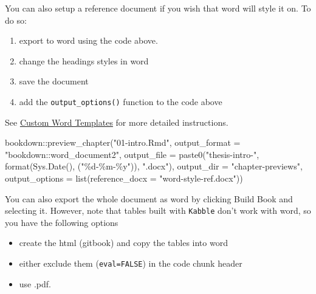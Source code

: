 \documentclass[
  12pt,
  oneside]{book}
\newenvironment{Shaded}{\begin{snugshade}}{\end{snugshade}}
\newcommand{\AttributeTok}[1]{\textcolor[rgb]{0.77,0.63,0.00}{#1}}
\newcommand{\FunctionTok}[1]{\textcolor[rgb]{0.00,0.00,0.00}{#1}}
\newcommand{\NormalTok}[1]{#1}
\newcommand{\SpecialCharTok}[1]{\textcolor[rgb]{0.00,0.00,0.00}{#1}}
\newcommand{\StringTok}[1]{\textcolor[rgb]{0.31,0.60,0.02}{#1}}
\providecommand{\tightlist}{%
  \setlength{\itemsep}{0pt}\setlength{\parskip}{0pt}}
\begin{document}
You can also setup a reference document if you wish that word will style it on. To do so:

\begin{enumerate}
\def\labelenumi{\arabic{enumi}.}
\tightlist
\item
  export to word using the code above.
\item
  change the headings styles in word
\item
  save the document
\item
  add the \texttt{output\_options()} function to the code above
\end{enumerate}

See \href{https://bookdown.org/yihui/rmarkdown-cookbook/word-template.html}{Custom Word Templates} for more detailed instructions.

\begin{Shaded}
\begin{Highlighting}[]
\NormalTok{bookdown}\SpecialCharTok{::}\FunctionTok{preview\_chapter}\NormalTok{(}\StringTok{"01{-}intro.Rmd"}\NormalTok{,}
                \AttributeTok{output\_format =} \StringTok{"bookdown::word\_document2"}\NormalTok{,}
                \AttributeTok{output\_file =} \FunctionTok{paste0}\NormalTok{(}\StringTok{"thesis{-}intro{-}"}\NormalTok{, }
                                     \FunctionTok{format}\NormalTok{(}\FunctionTok{Sys.Date}\NormalTok{(), }
\NormalTok{                                            (}\StringTok{"\%d{-}\%m{-}\%y"}\NormalTok{)), }
                                     \StringTok{".docx"}\NormalTok{),}
                \AttributeTok{output\_dir =} \StringTok{"chapter{-}previews"}\NormalTok{,}
                \AttributeTok{output\_options =} \FunctionTok{list}\NormalTok{(}\AttributeTok{reference\_docx =} \StringTok{"word{-}style{-}ref.docx"}\NormalTok{))}
\end{Highlighting}
\end{Shaded}

You can also export the whole document as word by clicking Build Book and selecting it. However, note that tables built with \texttt{Kabble} don't work with word, so you have the following options

\begin{itemize}
\tightlist
\item
  create the html (gitbook) and copy the tables into word
\item
  either exclude them (\texttt{eval=FALSE}) in the code chunk header
\item
  use .pdf.
\end{itemize}
\end{document}
